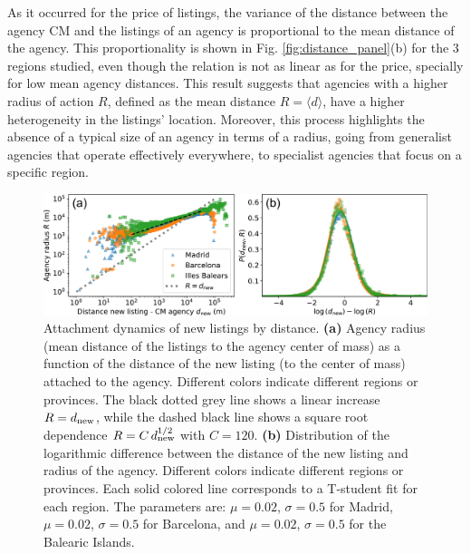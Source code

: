 As it occurred for the price of listings, the variance of the distance between the agency CM and the listings of an agency is proportional to the mean distance of the agency. This proportionality is shown in Fig. \ref{fig:distance_panel}(b) for the 3 regions studied, even though the relation is not as linear as for the price, specially for low mean agency distances. This result suggests that agencies with a higher radius of action $R$, defined as the mean distance $R = \langle d \rangle$, have a higher heterogeneity in the listings' location. Moreover, this process highlights the absence of a typical size of an agency in terms of a radius, going from generalist agencies that operate effectively everywhere, to specialist agencies that focus on a specific region.

\begin{figure}
    \centering
    \includegraphics[width =\textwidth]{Figs/Idealista_dynamics/distance_attach.pdf}
	\caption[Attachment dynamics of new listings by distance.]{ Attachment dynamics of new listings by distance. \textbf{(a)} Agency radius (mean distance of the listings to the agency center of mass) as a function of the distance of the new listing (to the center of mass) attached to the agency. Different colors indicate different regions or provinces. The black dotted grey line shows a linear increase $R = d_{\rm new}$, while the dashed black line shows a square root dependence $R = C \, d_{\rm new}^{1/2}$ with $C = 120$. \textbf{(b)} Distribution of the logarithmic difference between the distance of the new listing and radius of the agency. Different colors indicate different regions or provinces. Each solid colored line corresponds to a T-student fit for each region. The parameters are: $\mu = 0.02$, $\sigma = 0.5$ for Madrid, $\mu = 0.02$, $\sigma = 0.5$ for Barcelona, and $\mu = 0.02$, $\sigma = 0.5$ for the Balearic Islands. \label{fig:distance_attach}}
\end{figure}

